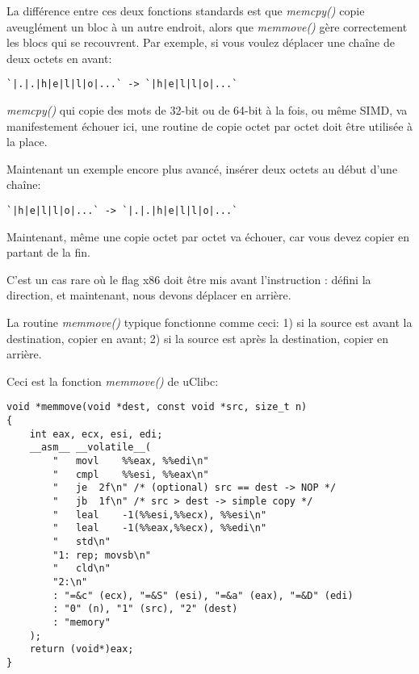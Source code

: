 \label{memmove_and_DF}

La différence entre ces deux fonctions standards est que \emph{memcpy()} copie aveuglément
un bloc à un autre endroit, alors que \emph{memmove()} gère correctement les blocs
qui se recouvrent.
Par exemple, si vous voulez déplacer une chaîne de deux octets en avant:

\begin{lstlisting}
`|.|.|h|e|l|l|o|...` -> `|h|e|l|l|o|...`
\end{lstlisting}

\emph{memcpy()} qui copie des mots de 32-bit ou de 64-bit à la fois, ou même \ac{SIMD},
va manifestement échouer ici, une routine de copie octet par octet doit être utilisée
à la place.

Maintenant un exemple encore plus avancé, insérer deux octets au début d'une chaîne:

\begin{lstlisting}
`|h|e|l|l|o|...` -> `|.|.|h|e|l|l|o|...`
\end{lstlisting}

Maintenant, même une copie octet par octet va échouer, car vous devez copier en partant
de la fin.

C'est un cas rare où le flag x86  doit être mis avant l'instruction :
 défini la direction, et maintenant, nous devons déplacer en arrière.

La routine \emph{memmove()} typique fonctionne comme ceci:
1) si la source est avant la destination, copier en avant;
2) si la source est après la destination, copier en arrière.

Ceci est la fonction \emph{memmove()} de uClibc:

\begin{lstlisting}[style=customc]
void *memmove(void *dest, const void *src, size_t n)
{
	int eax, ecx, esi, edi;
	__asm__ __volatile__(
		"	movl	%%eax, %%edi\n"
		"	cmpl	%%esi, %%eax\n"
		"	je	2f\n" /* (optional) src == dest -> NOP */
		"	jb	1f\n" /* src > dest -> simple copy */
		"	leal	-1(%%esi,%%ecx), %%esi\n"
		"	leal	-1(%%eax,%%ecx), %%edi\n"
		"	std\n"
		"1:	rep; movsb\n"
		"	cld\n"
		"2:\n"
		: "=&c" (ecx), "=&S" (esi), "=&a" (eax), "=&D" (edi)
		: "0" (n), "1" (src), "2" (dest)
		: "memory"
	);
	return (void*)eax;
}
\end{lstlisting}

